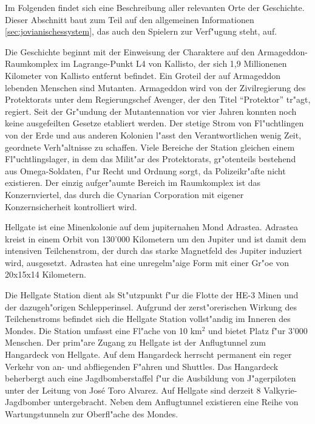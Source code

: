 

Im Folgenden findet sich eine Beschreibung aller relevanten Orte der Geschichte. Dieser Abschnitt baut zum Teil auf den allgemeinen Informationen \cref{sec:jovianischessystem}, das auch den Spielern zur Verf"ugung steht, auf.


Die Geschichte beginnt mit der Einweisung der Charaktere auf den Armageddon-Raumkomplex im Lagrange-Punkt L4 von Kallisto, der sich 1,9 Millionenen Kilometer von Kallisto entfernt befindet. Ein Gro\3teil der auf Armageddon lebenden Menschen sind Mutanten. Armageddon wird von der Zivilregierung des Protektorats unter dem Regierungschef Avenger, der den Titel ``Protektor'' tr"agt, regiert. Seit der Gr"undung der Mutantennation vor vier Jahren konnten noch keine ausgefeilten Gesetze etabliert werden. Der stetige Strom von Fl"uchtlingen von der Erde und aus anderen Kolonien l"asst den Verantwortlichen wenig Zeit, geordnete Verh"altnisse zu schaffen. Viele Bereiche der Station gleichen einem Fl"uchtlingslager, in dem das Milit"ar des Protektorats, gr"o\3tenteils bestehend aus Omega-Soldaten, f"ur Recht und Ordnung sorgt, da Polizeikr"afte nicht existieren. Der einzig aufger"aumte Bereich im Raumkomplex ist das Konzernviertel, das durch die Cynarian Corporation mit eigener Konzernsicherheit kontrolliert wird.


Hellgate ist eine Minenkolonie auf dem jupiternahen Mond Adrastea. Adrastea kreist in einem Orbit von 130'000 Kilometern um den Jupiter und
ist damit dem intensiven Teilchenstrom, der durch das starke Magnetfeld des Jupiter induziert wird, ausgesetzt. Adrastea hat eine unregelm"a\3ige Form mit einer Gr"o\3e von 20x15x14 Kilometern.

Die Hellgate Station dient als St"utzpunkt f"ur die Flotte der HE-3 Minen und der dazugeh"origen Schlepperinsel. Aufgrund der zerst"orerischen Wirkung des Teilchenstroms befindet sich die Hellgate Station vollst"andig im Inneren des Mondes. Die Station umfasst eine Fl"ache von 10 km$^{2}$ und bietet Platz f"ur 3'000 Menschen. Der prim"are Zugang zu Hellgate ist der Anflugtunnel zum Hangardeck von Hellgate. Auf dem Hangardeck herrscht permanent ein reger Verkehr von an- und abfliegenden F"ahren und Shuttles. Das Hangardeck beherbergt auch eine Jagdbomberstaffel f"ur die Ausbildung von J"agerpiloten unter der Leitung von Jos\'{e} \frqq{}Toro\flqq{} Alvarez. Auf Hellgate sind derzeit 8 Valkyrie-Jagdbomber untergebracht. Neben dem Anflugtunnel existieren eine Reihe von Wartungstunneln zur Oberfl"ache des Mondes.

